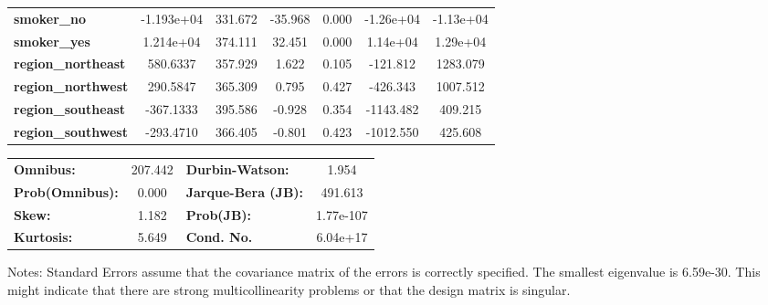 \begin{center}
\begin{tabular}{lcccccc}
\textbf{smoker\_no}        &   -1.193e+04  &      331.672     &   -35.968  &         0.000        &    -1.26e+04    &    -1.13e+04     \\
\textbf{smoker\_yes}       &    1.214e+04  &      374.111     &    32.451  &         0.000        &     1.14e+04    &     1.29e+04     \\
\textbf{region\_northeast} &     580.6337  &      357.929     &     1.622  &         0.105        &     -121.812    &     1283.079     \\
\textbf{region\_northwest} &     290.5847  &      365.309     &     0.795  &         0.427        &     -426.343    &     1007.512     \\
\textbf{region\_southeast} &    -367.1333  &      395.586     &    -0.928  &         0.354        &    -1143.482    &      409.215     \\
\textbf{region\_southwest} &    -293.4710  &      366.405     &    -0.801  &         0.423        &    -1012.550    &      425.608     \\
\bottomrule
\end{tabular}
\begin{tabular}{lclc}
\textbf{Omnibus:}       & 207.442 & \textbf{  Durbin-Watson:     } &     1.954  \\
\textbf{Prob(Omnibus):} &   0.000 & \textbf{  Jarque-Bera (JB):  } &   491.613  \\
\textbf{Skew:}          &   1.182 & \textbf{  Prob(JB):          } & 1.77e-107  \\
\textbf{Kurtosis:}      &   5.649 & \textbf{  Cond. No.          } &  6.04e+17  \\
\bottomrule
\end{tabular}
\end{center}

Notes: \newline
 [1] Standard Errors assume that the covariance matrix of the errors is correctly specified. \newline
 [2] The smallest eigenvalue is 6.59e-30. This might indicate that there are \newline
 strong multicollinearity problems or that the design matrix is singular.